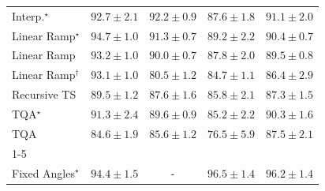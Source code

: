 \begin{tabular}{l|cccc|}
Interp.$^\star$ & {\cellcolor[HTML]{005C32}} \color[HTML]{F1F1F1} $92.7\pm 2.1$ & {\cellcolor[HTML]{005F34}} \color[HTML]{F1F1F1} $92.2\pm 0.9$ & {\cellcolor[HTML]{13773D}} \color[HTML]{F1F1F1} $87.6\pm 1.8$ & {\cellcolor[HTML]{006636}} \color[HTML]{F1F1F1} $91.1\pm 2.0$ \\
Linear Ramp$^\star$ & {\cellcolor[HTML]{00502D}} \color[HTML]{F1F1F1} $94.7\pm 1.0$ & {\cellcolor[HTML]{006536}} \color[HTML]{F1F1F1} $91.3\pm 0.7$ & {\cellcolor[HTML]{096F3A}} \color[HTML]{F1F1F1} $89.2\pm 2.2$ & {\cellcolor[HTML]{026A38}} \color[HTML]{F1F1F1} $90.4\pm 0.7$ \\
Linear Ramp & {\cellcolor[HTML]{005931}} \color[HTML]{F1F1F1} $93.2\pm 1.0$ & {\cellcolor[HTML]{056C39}} \color[HTML]{F1F1F1} $90.0\pm 0.7$ & {\cellcolor[HTML]{12763D}} \color[HTML]{F1F1F1} $87.8\pm 2.0$ & {\cellcolor[HTML]{086E3A}} \color[HTML]{F1F1F1} $89.5\pm 0.8$ \\
Linear Ramp$^\dagger$ & {\cellcolor[HTML]{005A31}} \color[HTML]{F1F1F1} $93.1\pm 1.0$ & {\cellcolor[HTML]{3BA358}} \color[HTML]{F1F1F1} $80.5\pm 1.2$ & {\cellcolor[HTML]{258745}} \color[HTML]{F1F1F1} $84.7\pm 1.1$ & {\cellcolor[HTML]{1A7D40}} \color[HTML]{F1F1F1} $86.4\pm 2.9$ \\
Recursive TS & {\cellcolor[HTML]{086E3A}} \color[HTML]{F1F1F1} $89.5\pm 1.2$ & {\cellcolor[HTML]{13773D}} \color[HTML]{F1F1F1} $87.6\pm 1.6$ & {\cellcolor[HTML]{1F8142}} \color[HTML]{F1F1F1} $85.8\pm 2.1$ & {\cellcolor[HTML]{15793E}} \color[HTML]{F1F1F1} $87.3\pm 1.5$ \\
TQA$^\star$ & {\cellcolor[HTML]{006536}} \color[HTML]{F1F1F1} $91.3\pm 2.4$ & {\cellcolor[HTML]{076D39}} \color[HTML]{F1F1F1} $89.6\pm 0.9$ & {\cellcolor[HTML]{228343}} \color[HTML]{F1F1F1} $85.2\pm 2.2$ & {\cellcolor[HTML]{026A38}} \color[HTML]{F1F1F1} $90.3\pm 1.6$ \\
TQA & {\cellcolor[HTML]{258745}} \color[HTML]{F1F1F1} $84.6\pm 1.9$ & {\cellcolor[HTML]{208242}} \color[HTML]{F1F1F1} $85.6\pm 1.2$ & {\cellcolor[HTML]{5DB96B}} \color[HTML]{F1F1F1} $76.5\pm 5.9$ & {\cellcolor[HTML]{14783E}} \color[HTML]{F1F1F1} $87.5\pm 2.1$ \\
\cline{1-5}
\multicolumn{5}{c}{\rule{0pt}{8pt}SV} \\
\midrule
Fixed Angles$^\star$ & {\cellcolor[HTML]{03446A}} \color[HTML]{F1F1F1} $94.4\pm 1.5$ & {\cellcolor[HTML]{000000}} \color[HTML]{F1F1F1} {\cellcolor{white}} \color{black} - & {\cellcolor[HTML]{023858}} \color[HTML]{F1F1F1} $96.5\pm 1.4$ & {\cellcolor[HTML]{02395A}} \color[HTML]{F1F1F1} $96.2\pm 1.4$ \\

\end{tabular}

